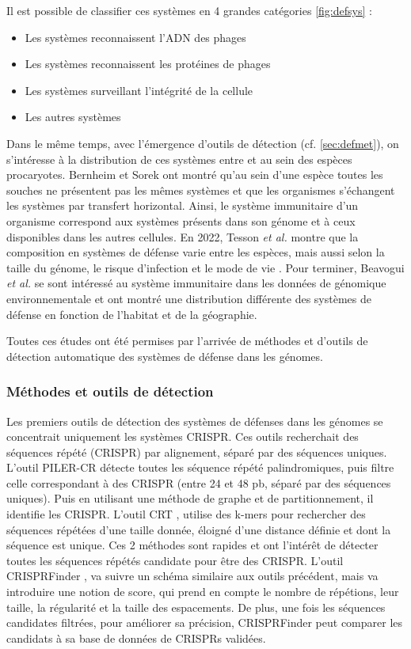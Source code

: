 Il est possible de classifier ces systèmes en 4 grandes catégories \autoref{fig:defsys} :
\begin{itemize}
    \item Les systèmes reconnaissent l'ADN des phages 
    \item Les systèmes reconnaissent les protéines de phages 
    \item Les systèmes surveillant l'intégrité de la cellule 
    \item Les autres systèmes 
\end{itemize}

Dans le même temps, avec l'émergence d'outils de détection (cf. \autoref{sec:defmet}), on s'intéresse à la distribution de ces systèmes entre et au sein des espèces procaryotes. Bernheim et Sorek \cite{bernheim_pan-immune_2020} ont montré qu'au sein d'une espèce toutes les souches ne présentent pas les mêmes systèmes et que les organismes s'échangent les systèmes par transfert horizontal. Ainsi, le système immunitaire d'un organisme correspond aux systèmes présents dans son génome et à ceux disponibles dans les autres cellules. En 2022, Tesson \textit{et al.} montre que la composition en systèmes de défense varie entre les espèces, mais aussi selon la taille du génome, le risque d'infection et le mode de vie \cite{tesson_systematic_2022}. Pour terminer, Beavogui \textit{et al.} \cite{beavogui_defensome_2024} se sont intéressé au système immunitaire dans les données de génomique environnementale et ont montré une distribution différente des systèmes de défense en fonction de l'habitat et de la géographie.

Toutes ces études ont été permises par l'arrivée de méthodes et d'outils de détection automatique des systèmes de défense dans les génomes.

\subsubsection{Méthodes et outils de détection}
\label{sec:defmet}

Les premiers outils de détection des systèmes de défenses dans les génomes se concentrait uniquement les systèmes CRISPR. Ces outils recherchait des séquences répété (CRISPR) par alignement, séparé par des séquences uniques. L'outil PILER-CR \cite{edgar_piler-cr_2007} détecte toutes les séquence répété palindromiques, puis filtre celle correspondant à des CRISPR (entre 24 et 48 pb, séparé par des séquences uniques). Puis en utilisant une méthode de graphe et de partitionnement, il identifie les CRISPR. L'outil CRT \cite{bland_crispr_2007}, utilise des k-mers pour rechercher des séquences répétées d'une taille donnée, éloigné d'une distance définie et dont la séquence est unique. Ces 2 méthodes sont rapides et ont l'intérêt de détecter toutes les séquences répétés candidate pour être des CRISPR. L'outil CRISPRFinder \cite{grissa_crisprfinder_2007}, va suivre un schéma similaire aux outils précédent, mais va introduire une notion de score, qui prend en compte le nombre de répétions, leur taille, la régularité et la taille des espacements. De plus, une fois les séquences candidates filtrées, pour améliorer sa précision, CRISPRFinder peut comparer les candidats à sa base de données de CRISPRs validées.

